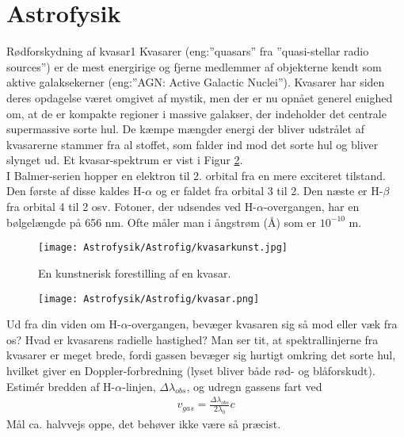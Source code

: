 \section*{Astrofysik}
\begin{opgave}{Rødforskydning af kvasar}{1}
	Kvasarer (eng:”quasars” fra ”quasi-stellar radio sources”) er de mest energirige og
	fjerne medlemmer af objekterne kendt som aktive galaksekerner (eng:”AGN: Active
	Galactic Nuclei”). Kvasarer har siden deres opdagelse været omgivet af mystik, men
	der er nu opnået generel enighed om, at de er kompakte regioner i massive galakser,
	der indeholder det centrale supermassive sorte hul. De kæmpe mængder energi der
	bliver udstrålet af kvasarerne stammer fra al stoffet, som falder ind mod det sorte
	hul og bliver slynget ud.
	Et kvasar-spektrum er vist i Figur \ref{kvasar}.
	\\
	I Balmer-serien hopper en elektron til 2. orbital fra en mere exciteret tilstand. Den første af disse kaldes H-$\alpha$ og er faldet fra orbital 3 til 2. Den næste er H-$\beta$ fra orbital 4 til 2 osv. Fotoner, der udsendes ved H-$\alpha$-overgangen, har en bølgelængde på 656 nm. Ofte måler man i ångstrøm (Å) som er $10^{-10}$ m.\\
	\begin{figure}[h!]
		\centering
		\texttt{[image: Astrofysik/Astrofig/kvasarkunst.jpg]}
		\caption{En kunstnerisk forestilling af en kvasar.} %
		\label{kvasarkunst}
	\end{figure}
	\begin{figure}[h!]
		\centering
		\texttt{[image: Astrofysik/Astrofig/kvasar.png]}
		\caption{ } %
		\label{kvasar}
	\end{figure}
	\opg Ud fra din viden om H-$\alpha$-overgangen, bevæger kvasaren sig så mod eller væk fra os?
	\opg Hvad er kvasarens radielle hastighed?
	\opg Man ser tit, at spektrallinjerne fra kvasarer er meget brede, fordi gassen bevæger sig hurtigt omkring det sorte hul, hvilket giver en Doppler-forbredning
	(lyset bliver både rød- og blåforskudt). Estimér bredden af H-$\alpha$-linjen, $\Delta\lambda_{obs}$, og udregn gassens fart ved 
	\begin{align}
	v_{gas}=\frac{\Delta \lambda_{obs}}{2\lambda_{0}}c
	\end{align}
	Mål ca. halvvejs oppe, det behøver ikke være så præcist.
\end{opgave}
